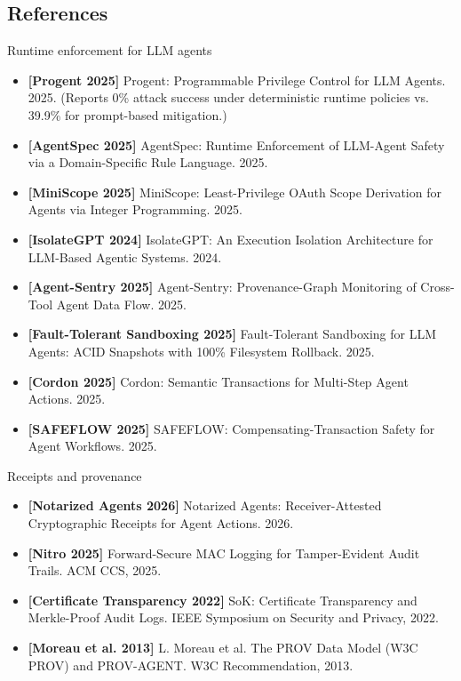 \documentclass[
]{article}
\providecommand{\tightlist}{%
  \setlength{\itemsep}{0pt}\setlength{\parskip}{0pt}}
\begin{document}
\subsection{References}\label{references}

Runtime enforcement for LLM agents

\begin{itemize}
\tightlist
\item
  \textbf{{[}Progent 2025{]}} Progent: Programmable Privilege Control
  for LLM Agents. 2025. (Reports 0\% attack success under deterministic
  runtime policies vs. 39.9\% for prompt-based mitigation.)
\item
  \textbf{{[}AgentSpec 2025{]}} AgentSpec: Runtime Enforcement of
  LLM-Agent Safety via a Domain-Specific Rule Language. 2025.
\item
  \textbf{{[}MiniScope 2025{]}} MiniScope: Least-Privilege OAuth Scope
  Derivation for Agents via Integer Programming. 2025.
\item
  \textbf{{[}IsolateGPT 2024{]}} IsolateGPT: An Execution Isolation
  Architecture for LLM-Based Agentic Systems. 2024.
\item
  \textbf{{[}Agent-Sentry 2025{]}} Agent-Sentry: Provenance-Graph
  Monitoring of Cross-Tool Agent Data Flow. 2025.
\item
  \textbf{{[}Fault-Tolerant Sandboxing 2025{]}} Fault-Tolerant
  Sandboxing for LLM Agents: ACID Snapshots with 100\% Filesystem
  Rollback. 2025.
\item
  \textbf{{[}Cordon 2025{]}} Cordon: Semantic Transactions for
  Multi-Step Agent Actions. 2025.
\item
  \textbf{{[}SAFEFLOW 2025{]}} SAFEFLOW: Compensating-Transaction Safety
  for Agent Workflows. 2025.
\end{itemize}

Receipts and provenance

\begin{itemize}
\tightlist
\item
  \textbf{{[}Notarized Agents 2026{]}} Notarized Agents:
  Receiver-Attested Cryptographic Receipts for Agent Actions. 2026.
\item
  \textbf{{[}Nitro 2025{]}} Forward-Secure MAC Logging for
  Tamper-Evident Audit Trails. ACM CCS, 2025.
\item
  \textbf{{[}Certificate Transparency 2022{]}} SoK: Certificate
  Transparency and Merkle-Proof Audit Logs. IEEE Symposium on Security
  and Privacy, 2022.
\item
  \textbf{{[}Moreau et al. 2013{]}} L. Moreau et al. The PROV Data Model
  (W3C PROV) and PROV-AGENT. W3C Recommendation, 2013.
\end{itemize}
\end{document}
